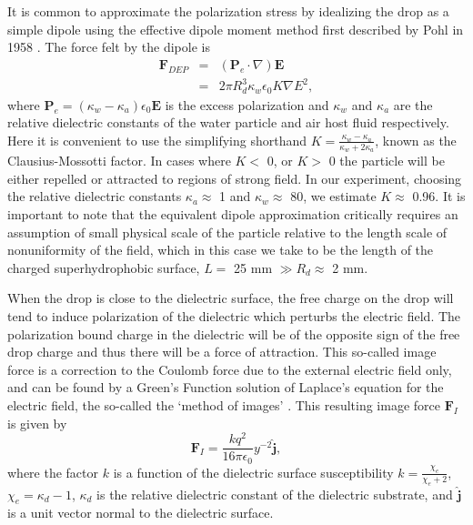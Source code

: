 \documentclass[aip,reprint, floatfix]{revtex4-1}
\begin{document}
It is common to approximate the polarization stress by idealizing the drop as a simple dipole using the effective dipole moment method first described by Pohl in 1958 \cite{pohl_effects_1958}. The force felt by the dipole is 
\begin{eqnarray} \label{dep_force}
\mathbf{F}_{DEP} &=& \left( \mathbf{P}_e \cdot \nabla \right) \mathbf{E} \nonumber \\
&=& 2 \pi R_d^3 \kappa_w \epsilon_0 K \nabla E^2,
\end{eqnarray}
where $\mathbf{P}_e=(\kappa_w - \kappa_a)\epsilon_0 \mathbf{E}$ is the excess polarization and $\kappa_w$ and $\kappa_a$ are the relative dielectric constants of the water particle and air host fluid respectively. Here it is convenient to use the simplifying shorthand $K = \frac{\kappa_w - \kappa_a}{\kappa_w + 2 \kappa_a}$, known as the Clausius-Mossotti factor. In cases where $K <$ 0, or $K>$ 0 the particle will be either repelled or attracted to regions of strong field. In our experiment, choosing the relative dielectric constants $\kappa_a \approx$ 1 and $\kappa_w \approx$ 80, we estimate $K \approx$ 0.96. It is important to note that the equivalent dipole approximation critically requires an assumption of small physical scale of the particle relative to the length scale of nonuniformity of the field, which in this case we take to be the length of the charged superhydrophobic surface, $L =$ 25 mm $\gg R_d \approx$ 2 mm.

When the drop is close to the dielectric surface, the free charge on the drop will tend to induce polarization of the dielectric which perturbs the electric field. The polarization bound charge in the dielectric will be of the opposite sign of the free drop charge and thus there will be a force of attraction. This so-called image force is a correction to the Coulomb force due to the external electric field only, and can be found by a Green's Function solution of Laplace's equation for the electric field, the so-called the `method of images' \cite{david_j._griffiths_introduction_1999}. This resulting image force $\mathbf{F}_I$ is given by
\begin{equation}
\mathbf{F}_I = \frac{k q^2}{16 \pi \epsilon_0} y^{-2} \hat{\mathbf{j}},
\label{image_force}
\end{equation}
where the factor $k$ is a function of the dielectric surface susceptibility $k = \frac{\chi_e}{\chi_e + 2}$, $\chi_e = \kappa_d - 1$, $\kappa_d$ is the relative dielectric constant of the dielectric substrate, and $\hat{\mathbf{j}}$ is a unit vector normal to the dielectric surface.
\end{document}
